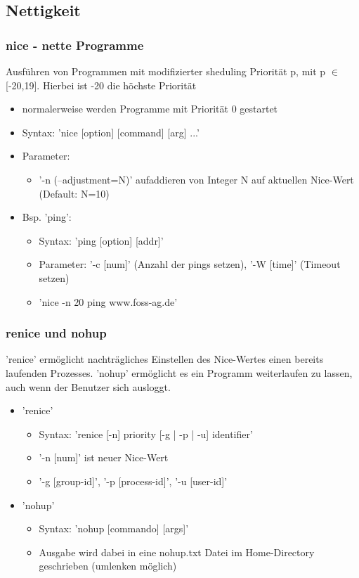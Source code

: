 \documentclass[12pt,utf8]{beamer}
\begin{document}
\subsection{Nettigkeit}
\begin{frame}
\frametitle{nice - nette Programme}
Ausführen von Programmen mit modifizierter sheduling Priorität p, mit p $\in$ [-20,19]. Hierbei ist -20 die höchste Priorität
\begin{itemize}[<+->]
	\item normalerweise werden Programme mit Priorität 0 gestartet
	\item Syntax: 'nice [option] [command] [arg] ...'
	\item Parameter:
	\begin{itemize}
		\item '-n (--adjustment=N)' aufaddieren von Integer N auf aktuellen Nice-Wert (Default: N=10)
	\end{itemize}
	\item Bsp. 'ping':
	\begin{itemize}[<+->]
		\item Syntax: 'ping [option] [addr]'
		\item Parameter: '-c [num]' (Anzahl der pings setzen), '-W [time]' (Timeout setzen)
		\item 'nice -n 20 ping www.foss-ag.de'
	\end{itemize}
\end{itemize}
\end{frame}

\begin{frame}
\frametitle{renice und nohup}
'renice' ermöglicht nachträgliches Einstellen des Nice-Wertes einen bereits laufenden Prozesses.
'nohup' ermöglicht es ein Programm weiterlaufen zu lassen, auch wenn der Benutzer sich ausloggt.
\begin{itemize}
	\item 'renice'
	\begin{itemize}[<+->]
		\item Syntax: 'renice [-n] priority [-g | -p | -u] identifier'
		\item '-n [num]' ist neuer Nice-Wert
		\item '-g [group-id]', '-p [process-id]', '-u [user-id]'
	\end{itemize}
	\item 'nohup'
	\begin{itemize}
		\item Syntax: 'nohup [commando] [args]'
		\item Ausgabe wird dabei in eine nohup.txt Datei im Home-Directory geschrieben (umlenken möglich)
	\end{itemize}
\end{itemize}
\end{frame}
\end{document}
